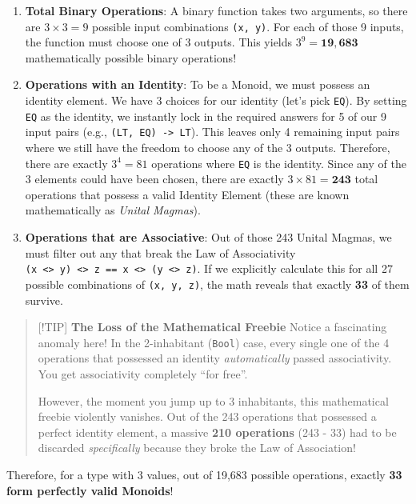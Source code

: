 \documentclass[
]{article}
\providecommand{\tightlist}{%
  \setlength{\itemsep}{0pt}\setlength{\parskip}{0pt}}
\begin{document}
\begin{enumerate}
\def\labelenumi{\arabic{enumi}.}
\tightlist
\item
  \textbf{Total Binary Operations}: A binary function takes two
  arguments, so there are \(3 \times 3 = 9\) possible input combinations
  \texttt{(x,\ y)}. For each of those 9 inputs, the function must choose
  one of 3 outputs. This yields \(3^9 = \mathbf{19,683}\) mathematically
  possible binary operations!
\item
  \textbf{Operations with an Identity}: To be a Monoid, we must possess
  an identity element. We have 3 choices for our identity (let's pick
  \texttt{EQ}). By setting \texttt{EQ} as the identity, we instantly
  lock in the required answers for 5 of our 9 input pairs (e.g.,
  \texttt{(LT,\ EQ)\ -\textgreater{}\ LT}). This leaves only 4 remaining
  input pairs where we still have the freedom to choose any of the 3
  outputs. Therefore, there are exactly \(3^4 = 81\) operations where
  \texttt{EQ} is the identity. Since any of the 3 elements could have
  been chosen, there are exactly \(3 \times 81 = \mathbf{243}\) total
  operations that possess a valid Identity Element (these are known
  mathematically as \emph{Unital Magmas}).
\item
  \textbf{Operations that are Associative}: Out of those 243 Unital
  Magmas, we must filter out any that break the Law of Associativity
  \texttt{(x\ \textless{}\textgreater{}\ y)\ \textless{}\textgreater{}\ z\ ==\ x\ \textless{}\textgreater{}\ (y\ \textless{}\textgreater{}\ z)}.
  If we explicitly calculate this for all 27 possible combinations of
  \texttt{(x,\ y,\ z)}, the math reveals that exactly \textbf{33} of
  them survive.
\end{enumerate}

\begin{quote}
{[}!TIP{]} \textbf{The Loss of the Mathematical Freebie} Notice a
fascinating anomaly here! In the 2-inhabitant (\texttt{Bool}) case,
every single one of the 4 operations that possessed an identity
\emph{automatically} passed associativity. You get associativity
completely ``for free''.

However, the moment you jump up to 3 inhabitants, this mathematical
freebie violently vanishes. Out of the 243 operations that possessed a
perfect identity element, a massive \textbf{210 operations} (243 - 33)
had to be discarded \emph{specifically} because they broke the Law of
Association!
\end{quote}

Therefore, for a type with 3 values, out of 19,683 possible operations,
exactly \textbf{33 form perfectly valid Monoids}!
\end{document}
